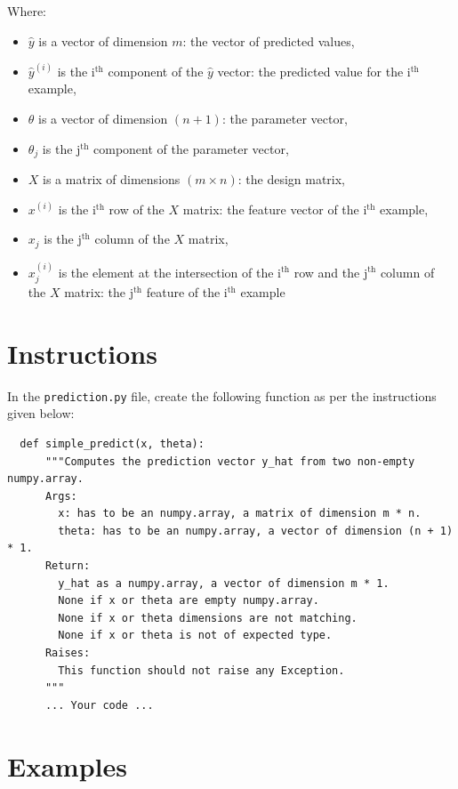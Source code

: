 \documentclass{42-en}
\begin{document}
Where:
\begin{itemize}
  \item $\hat{y}$ is a vector of dimension $m$: the vector of predicted values,
  \item $\hat{y}^{(i)}$ is the i$^\text{th}$ component of the $\hat{y}$ vector: the predicted value for the i$^\text{th}$ example,
  \item $\theta$ is a vector of dimension $(n + 1)$: the parameter vector,
  \item $\theta_j$ is the j$^\text{th}$ component of the parameter vector,
  \item $X$ is a matrix of dimensions $(m \times n)$: the design matrix,
  \item $x^{(i)}$ is the i$^\text{th}$ row of the $X$ matrix: the feature vector of the i$^\text{th}$ example,
  \item $x_{j}$ is the j$^\text{th}$ column of the $X$ matrix,
  \item $x_j^{(i)}$ is the element at the intersection of the i$^\text{th}$ row and the j$^\text{th}$ column of the $X$ matrix: the j$^\text{th}$ feature of the i$^\text{th}$ example
\end{itemize}


\section*{Instructions}

In the \texttt{prediction.py} file, create the following function as per the instructions given below:
\par
\begin{verbatim}
  def simple_predict(x, theta):
      """Computes the prediction vector y_hat from two non-empty numpy.array.
      Args:
        x: has to be an numpy.array, a matrix of dimension m * n.
        theta: has to be an numpy.array, a vector of dimension (n + 1) * 1.
      Return:
        y_hat as a numpy.array, a vector of dimension m * 1.
        None if x or theta are empty numpy.array.
        None if x or theta dimensions are not matching.
        None if x or theta is not of expected type.
      Raises:
        This function should not raise any Exception.
      """
      ... Your code ...
\end{verbatim}

\section*{Examples}
\end{document}

